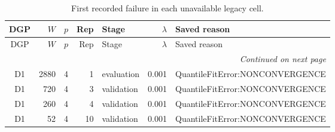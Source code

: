 \setlength{\LTpost}{3pt}
\begin{longtable}{crrrlrp{60mm}}
\caption{First recorded failure in each unavailable legacy cell.}\label{tab:v9-legacy-failures}\\
\toprule
DGP & $W$ & $p$ & Rep & Stage & $\lambda$ & Saved reason\\
\midrule
\endfirsthead
\toprule
DGP & $W$ & $p$ & Rep & Stage & $\lambda$ & Saved reason\\
\midrule
\endhead
\midrule
\multicolumn{7}{r}{\emph{Continued on next page}}\\
\endfoot
\bottomrule
\endlastfoot
D1 & 2880 & 4 & 1 & evaluation & 0.001 & QuantileFitError:NONCONVERGENCE\\
D1 & 720 & 4 & 3 & validation & 0.001 & QuantileFitError:NONCONVERGENCE\\
D1 & 260 & 4 & 4 & validation & 0.001 & QuantileFitError:NONCONVERGENCE\\
D1 & 52 & 4 & 10 & validation & 0.001 & QuantileFitError:NONCONVERGENCE\\

\end{longtable}
